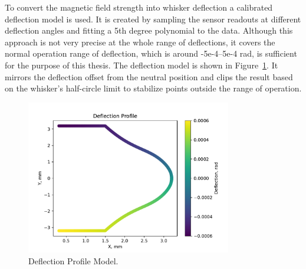 To convert the magnetic field strength into whisker deflection a calibrated deflection model is used.
It is created by sampling the sensor readouts at different deflection angles and fitting a 5th degree polynomial to the data.
Although this approach is not very precise at the whole range of deflections, it covers the normal operation range of deflection, which is around -5e-4--5e-4 rad, is sufficient for the purpose of this thesis.
The deflection model is shown in Figure~\ref{fig:deflection_profile}.
It mirrors the deflection offset from the neutral position and clips the result based on the whisker's half-circle limit to stabilize points outside the range of operation.

\begin{figure}[htb]
    \centering
    \includegraphics[width=0.8\textwidth]{figures/deflection_profile}
    \caption{Deflection Profile Model.}
    \label{fig:deflection_profile}
\end{figure}
